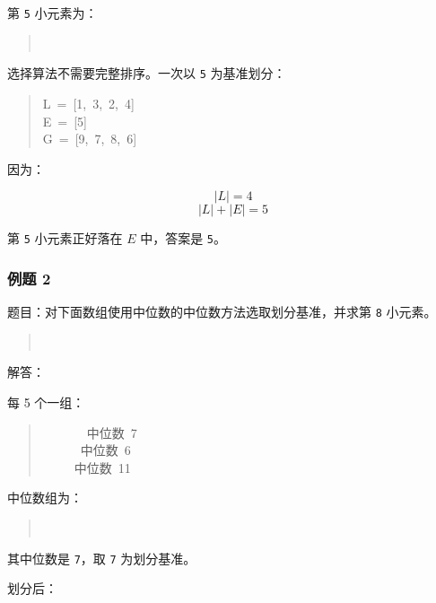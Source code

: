 \documentclass[UTF8,zihao=-4]{ctexart}
\begin{document}
第 \texttt{5} 小元素为：

\begin{quote}
\small\ttfamily\raggedright
{}\\
\end{quote}

选择算法不需要完整排序。一次以 \texttt{5} 为基准划分：

\begin{quote}
\small\ttfamily\raggedright
\relax L\ =\ [1,\ 3,\ 2,\ 4]\\
\relax E\ =\ [5]\\
\relax G\ =\ [9,\ 7,\ 8,\ 6]\\
\end{quote}

因为：

\[|L| = 4\]
\[|L| + |E| = 5\]

第 \texttt{5} 小元素正好落在 $E$ 中，答案是 \texttt{5}。

\subsubsection*{例题 2}

题目：对下面数组使用中位数的中位数方法选取划分基准，并求第 \texttt{8} 小元素。

\begin{quote}
\small\ttfamily\raggedright
\relax [12,\ 5,\ 7,\ 1,\ 9,\ 3,\ 14,\ 6,\ 10,\ 2,\ 8,\ 15,\ 4,\ 13,\ 11]\\
\end{quote}

解答：

每 5 个一组：

\begin{quote}
\small\ttfamily\raggedright
\relax [12,\ 5,\ 7,\ 1,\ 9]\ \ \ \ \ \ \ 中位数\ 7\\
\relax [3,\ 14,\ 6,\ 10,\ 2]\ \ \ \ \ \ 中位数\ 6\\
\relax [8,\ 15,\ 4,\ 13,\ 11]\ \ \ \ \ 中位数\ 11\\
\end{quote}

中位数组为：

\begin{quote}
\small\ttfamily\raggedright
\relax [7,\ 6,\ 11]\\
\end{quote}

其中位数是 \texttt{7}，取 \texttt{7} 为划分基准。

划分后：
\end{document}
